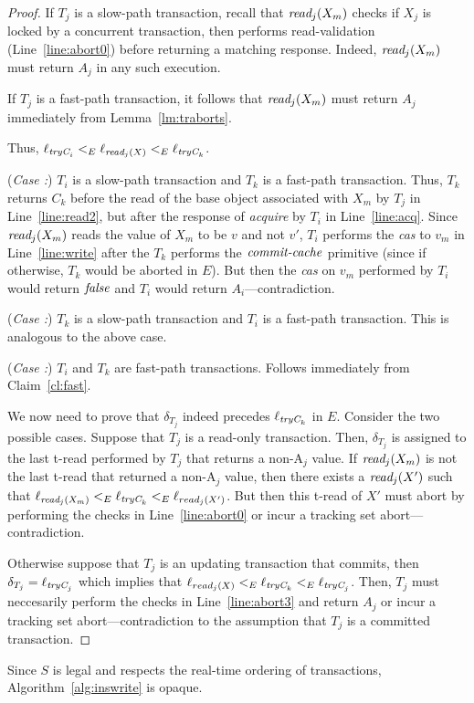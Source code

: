 \begin{proof}
If $T_j$ is a slow-path transaction, 
recall that $\textit{read}_j(X_m)$ checks if $X_j$ is locked by a concurrent transaction, 
then performs read-validation (Line~\ref{line:abort0}) before returning a matching response. 
Indeed, $\textit{read}_j(X_m)$ must return $A_j$ in any such execution.

If $T_j$ is a fast-path transaction, it follows that $\textit{read}_j(X_m)$ must return $A_j$
immediately from Lemma~\ref{lm:traborts}.

Thus, $\ell_{\textit{tryC}_i} <_E \ell_{\textit{read}_j(X)} <_{E} \ell_{\textit{tryC}_k}$.

(\textit{Case :}) $T_i$ is a slow-path transaction and $T_k$ is a fast-path transaction.
Thus, $T_k$ returns $C_k$ 
before the read of the base object associated with $X_m$ by $T_j$ in Line~\ref{line:read2}, but after the response
of \emph{acquire} by $T_i$ in Line~\ref{line:acq}.
Since $\textit{read}_j(X_m)$ reads the value of $X_m$ to be $v$ and not $v'$, $T_i$ performs the \emph{cas}
to $v_m$ in Line~\ref{line:write} after the $T_k$ performs the $\ms{commit-cache}$ primitive (since if
otherwise, $T_k$ would be aborted in $E$).
But then the \emph{cas} on $v_m$ performed by $T_i$ would return $\mathit{false}$ and $T_i$ would return $A_i$---contradiction.

(\textit{Case :}) $T_k$ is a slow-path transaction and $T_i$ is a fast-path transaction.
This is analogous to the above case.

(\textit{Case :}) $T_i$ and $T_k$ are fast-path transactions.
Follows immediately from Claim~\ref{cl:fast}.

We now need to prove that $\delta_{T_{j}}$ indeed precedes $\ell_{\textit{tryC}_k}$ in $E$.
Consider the two possible cases.
Suppose that $T_j$ is a read-only transaction. 
Then, $\delta_{T_j}$ is assigned to the last t-read performed by $T_j$ that returns a non-A$_j$ value. 
If $\textit{read}_j(X_m)$ is not the last t-read that returned a non-A$_j$ value, then there exists a $\textit{read}_j(X')$ such that 
$\ell_{\textit{read}_j(X_m)} <_{E} \ell_{\textit{tryC}_k} <_E \ell_{read_j(X')}$.
But then this t-read of $X'$ must abort by performing the checks in Line~\ref{line:abort0} or incur a tracking set abort---contradiction.

Otherwise suppose that $T_j$ is an updating transaction that commits, then $\delta_{T_j}=\ell_{\textit{tryC}_j}$ which implies that
$\ell_{read_j(X)} <_{E} \ell_{\textit{tryC}_k} <_E \ell_{\textit{tryC}_j}$. Then, $T_j$ must neccesarily perform the checks
in Line~\ref{line:abort3} and return $A_j$ or incur a tracking set abort---contradiction to the assumption that $T_j$ is a committed transaction.%
%
\end{proof}
%
Since $S$ is legal and respects the real-time ordering of transactions, Algorithm~\ref{alg:inswrite} is opaque.
%
